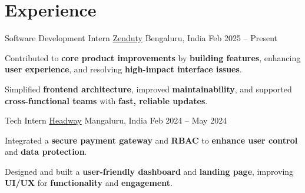 \section*{Experience}

\experience
  {Software Development Intern}
  {\href{https://www.zenduty.com/}{Zenduty}}
  {Bengaluru, India}
  {Feb 2025 -- Present}
  {
    \item Contributed to \textbf{core product improvements} by \textbf{building features}, enhancing \textbf{user experience}, and resolving \textbf{high-impact interface issues}.
    \item Simplified \textbf{frontend architecture}, improved \textbf{maintainability}, and supported \textbf{cross-functional teams} with \textbf{fast, reliable updates}.
  }

\experience
  {Tech Intern}
  {\href{https://headway.co.in/}{Headway}}
  {Mangaluru, India}
  {Feb 2024 -- May 2024}
  {
    \item Integrated a \textbf{secure payment gateway} and \textbf{RBAC} to \textbf{enhance user control} and \textbf{data protection}.
    \item Designed and built a \textbf{user-friendly dashboard} and \textbf{landing page}, improving \textbf{UI/UX} for \textbf{functionality} and \textbf{engagement}.
  }
